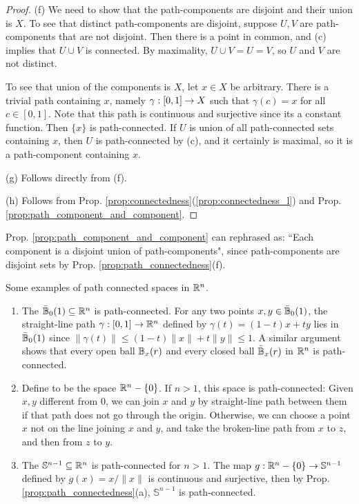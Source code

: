 \documentclass[11pt,a4paper]{article}
\begin{document}
\begin{proof}
\noindent(f) We need to show that the path-components are disjoint and their union is $X$. To see that distinct path-components are disjoint, suppose $U, V$ are path-components that are not disjoint. Then there is a point in common, and (c) implies that $U\cup V$ is connected. By maximality, $U\cup V = U = V$, so $U$ and $V$ are not distinct.

To see that union of the components is $X$, let $x\in X$ be arbitrary. There is a trivial path containing $x$, namely $\gamma:[0,1]\rightarrow X$ such that $\gamma(c) = x$ for all $c\in [0,1]$. Note that this path is continuous and surjective since its a constant function. Then $\{x\}$ is path-connected. If $U$ is union of all path-connected sets containing $x$, then $U$ is path-connected by (c), and it certainly is maximal, so it is a path-component containing $x$.

\noindent(g) Follows directly from (f).

\noindent(h) Follows from Prop. \ref{prop:connectedness}(\ref{prop:connectedness_l}) and Prop. \ref{prop:path_component_and_component}.
\end{proof}

\begin{remark}\label{remark:commponent_path_component}
Prop. \ref{prop:path_component_and_component} can rephrased as:
``Each component is a disjoint union of path-components", since path-components are disjoint sets by Prop. \ref{prop:path_connectedness}(f).
\end{remark}

\begin{example}
Some examples of path connected spaces in $\mathbb{R}^n$.
\begin{enumerate}
    \item The  $\bar{\mathbb{B}}_{0}(1)\subseteq \mathbb{R}^n$ is path-connected. For any two points $x,y\in \bar{\mathbb{B}}_{0}(1)$, the straight-line path $\gamma:[0,1]\rightarrow \mathbb{R}^n$ defined by $\gamma(t) = (1-t)x+ty$ lies in $\bar{\mathbb{B}}_{0}(1)$ since $\|\gamma(t)\|\le (1-t)\|x\|+t\|y\|\le 1$. A similar argument shows that every open ball $\mathbb{B}_{x}(r)$ and every closed ball $\bar{\mathbb{B}}_{x}(r)$ in $\mathbb{R}^n$ is path-connected.
    \item Define  to be the space $\mathbb{R}^n-\{0\}$. If $n>1$, this space is path-connected: Given $x,y$ different from $0$, we can join $x$ and $y$ by straight-line path between them if that path does not go through the origin. Otherwise, we can choose a point $x$ not on the line joining $x$ and $y$, and take the broken-line path from $x$ to $z$, and then from $z$ to $y$.
    \item The  $\mathbb{S}^{n-1}\subseteq \mathbb{R}^n$ is path-connected for $n>1$. The map $g:\mathbb{R}^n-\{0\}\rightarrow \mathbb{S}^{n-1}$ defined by $g(x) = x/\|x\|$ is continuous and surjective, then by Prop. \ref{prop:path_connectedness}(a), $\mathbb{S}^{n-1}$ is path-connected.
\end{enumerate}
\end{example}
\end{document}
